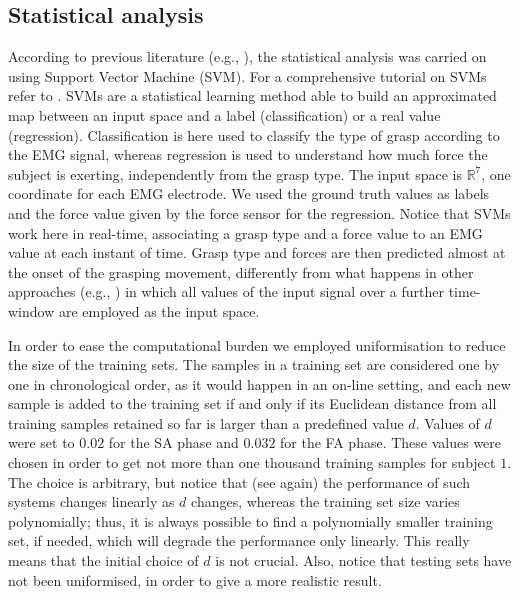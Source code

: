 \documentclass[10pt]{bmc_article}
\newenvironment{bmcformat}
  {\begin{raggedright}\baselineskip20pt\sloppy\setboolean{publ}{false}}
  {\end{raggedright}\baselineskip20pt\sloppy}
\def\RR{\mathbb{R}}
\begin{document}
\begin{bmcformat}
\subsection*{Statistical analysis}

According to previous literature (e.g., \cite{smagt,2008.BioCyb}), the
statistical analysis was carried on using Support Vector Machine (SVM).
For a comprehensive tutorial on SVMs refer to
\cite{Burges98,SmolaTut2004}. SVMs are a statistical learning method
able to build an approximated map between an input space and a label
(classification) or a real value (regression). Classification is here
used to classify the type of grasp according to the EMG signal,
whereas regression is used to understand how much force the subject is
exerting, independently from the grasp type. The input space is
$\RR^7$, one coordinate for each EMG electrode. We used the
ground truth values as labels and the force value given by the force sensor
for the regression. Notice that SVMs work here in real-time, associating a grasp type
and a force value to an EMG value at each instant of time.
Grasp type and forces are then predicted almost at the onset of the
grasping movement, differently from what happens in other approaches (e.g.,
\cite{smagt,Sebelius2005}) in which all values of the input signal over a
further time-window are employed as the input space.

In order to ease the computational burden we employed uniformisation
\cite{2008.BioCyb} to reduce the size of the training sets. The samples
in a training set are considered one by one in chronological order, as it
would happen in an on-line setting, and each new sample is added to the
training set if and only if its Euclidean distance from all training samples
retained so far is larger than a predefined value $d$. Values of $d$ were
set to $0.02$ for the SA phase and $0.032$ for the FA phase. These values
were chosen in order to get not more than one thousand training
samples for subject $1$. The choice is arbitrary, but notice that
(see \cite{2008.BioCyb} again) the performance of such
systems changes linearly as $d$ changes, whereas the training set size
varies polynomially; thus, it is always possible to find a
polynomially smaller training set, if needed, which will degrade the
performance only linearly. This really means that the initial choice
of $d$ is not crucial. Also, notice that testing sets have not been
uniformised, in order to give a more realistic result.


\end{bmcformat}
\end{document}
